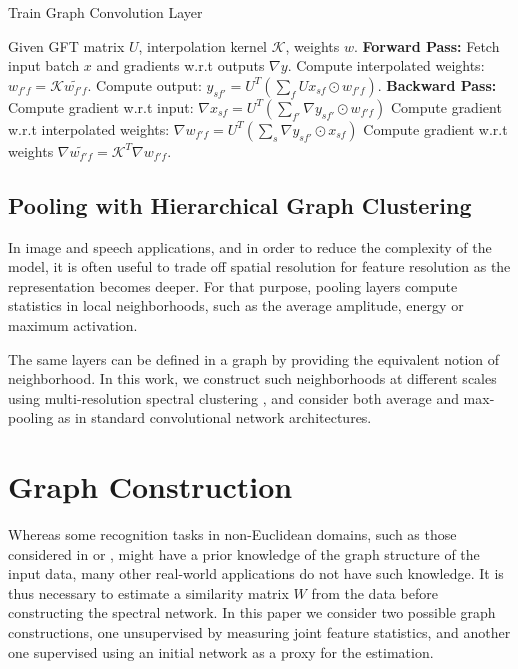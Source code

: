 \documentclass{article} %
\begin{document}
\begin{algorithm}
\caption{Train Graph Convolution Layer}
\label{pseudoPSO}
\begin{algorithmic}[1]
\State Given GFT matrix $U$, interpolation kernel $\mathcal{K}$, weights $w$. 
\State \textbf{Forward Pass:}
  \State Fetch input batch $x$ and gradients w.r.t outputs $\nabla y$.
  \State Compute interpolated weights: $w_{f'f} = \mathcal{K} \tilde{w_{f'f}}$.
  \State Compute output: $y_{sf'} = U^T\left(\sum_{f} Ux_{sf} \odot w_{f'f} \right)$.
  \State \textbf{Backward Pass:}
  \State Compute gradient w.r.t input: $\nabla x_{sf} = U^T\left(\sum_{f'} \nabla y_{sf'} \odot w_{f'f} \right)$
  \State Compute gradient w.r.t interpolated weights: $\nabla w_{f'f} = U^T\left(\sum_s \nabla y_{sf'} \odot x_{sf} \right)$
  \State Compute gradient w.r.t weights $\nabla \tilde{w_{f'f}} = \mathcal{K}^T \nabla w_{f'f}$.
\end{algorithmic}
\end{algorithm}

\subsection{Pooling with Hierarchical Graph Clustering}

In image and speech applications, and in order to reduce the complexity of the model, it is often useful to trade off spatial resolution for feature resolution as the representation becomes deeper. For that purpose, pooling layers compute statistics in local neighborhoods, such as the average amplitude, energy or maximum activation.

The same layers can be defined in a graph by providing the equivalent notion of neighborhood. In this work, we construct such neighborhoods at different scales using multi-resolution spectral clustering \cite{von2007tutorial}, and consider both average and max-pooling as in standard convolutional network architectures.

\section{ Graph Construction }
\label{graphestimsect}

Whereas some recognition tasks in non-Euclidean domains, such as those considered in \cite{spectralnet2013} or \cite{DBLP:journals/corr/MasciBBV15}, might have a prior knowledge of the graph structure of the input data, many other real-world applications do not have such knowledge. It is thus necessary to estimate a similarity matrix $W$ from the data before constructing the spectral network. In this paper we consider two possible graph constructions, one unsupervised by measuring joint feature statistics, and another one supervised using an initial network as a proxy for the estimation.
\end{document}
